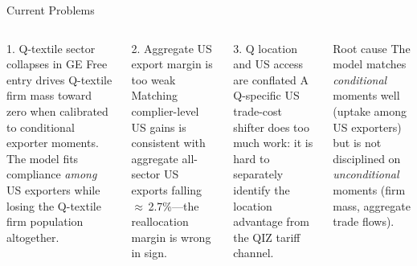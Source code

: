 \documentclass[aspectratio=169,10pt]{beamer}
\begin{document}
\begin{frame}{Current Problems}
\small
\begin{columns}[T]
\begin{alertblock}{1. Q-textile sector collapses in GE}
Free entry drives Q-textile firm mass toward zero when calibrated to conditional exporter moments. The model fits compliance \emph{among} US exporters while losing the Q-textile firm population altogether.
\end{alertblock}

\vspace{0.45em}
\begin{alertblock}{2. Aggregate US export margin is too weak}
Matching complier-level US gains is consistent with aggregate all-sector US exports falling $\approx$\,2.7\%---the reallocation margin is wrong in sign.
\end{alertblock}

\begin{alertblock}{3. Q location and US access are conflated}
A Q-specific US trade-cost shifter does too much work: it is hard to separately identify the location advantage from the QIZ tariff channel.
\end{alertblock}

\vspace{0.45em}
\begin{block}{Root cause}
The model matches \emph{conditional} moments well (uptake among US exporters) but is not disciplined on \emph{unconditional} moments (firm mass, aggregate trade flows).
\end{block}
\end{columns}
\end{frame}
\end{document}
